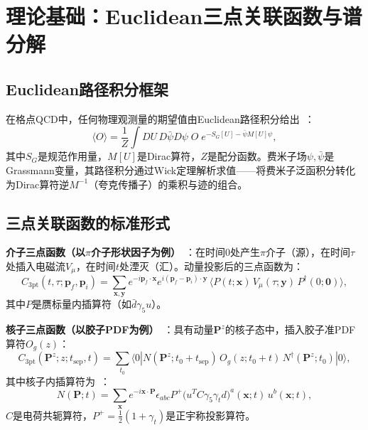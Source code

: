 \documentclass[12pt,a4paper]{ctexart}
\theoremstyle{definition}
\begin{document}
\section{理论基础：Euclidean三点关联函数与谱分解}

\subsection{Euclidean路径积分框架}

在格点QCD中，任何物理观测量的期望值由Euclidean路径积分给出~\cite{GattringerLang2010,wickContraction2026}：
\begin{equation}\label{eq:path_integral}
    \langle O \rangle = \frac{1}{Z} \int DU\,D\bar{\psi}D\psi \; O\; e^{-S_G[U] - \bar{\psi}M[U]\psi},
\end{equation}
其中$S_G$是规范作用量，$M[U]$是Dirac算符，$Z$是配分函数。费米子场$\psi,\bar{\psi}$是Grassmann变量，其路径积分通过Wick定理解析求值——将费米子泛函积分转化为Dirac算符逆$M^{-1}$（夸克传播子）的乘积与迹的组合。

\subsection{三点关联函数的标准形式}

\textbf{介子三点函数（以$\pi$介子形状因子为例）}~\cite{GattringerLang2010,formFactors2026}：在时间0处产生$\pi$介子（源），在时间$\tau$处插入电磁流$V_\mu$，在时间$t$处湮灭（汇）。动量投影后的三点函数为：
\begin{equation}\label{eq:meson_3pt}
    C_{3\text{pt}}(t, \tau; \mathbf{p}_f, \mathbf{p}_i) =
    \sum_{\mathbf{x},\mathbf{y}} e^{-i\mathbf{p}_f\cdot\mathbf{x}} e^{i(\mathbf{p}_f-\mathbf{p}_i)\cdot\mathbf{y}}\,
    \langle P(t;\mathbf{x})\, V_\mu(\tau;\mathbf{y})\, P^\dagger(0;\mathbf{0}) \rangle,
\end{equation}
其中$P$是赝标量内插算符（如$\bar{d}\gamma_5 u$）。

\textbf{核子三点函数（以胶子PDF为例）}~\cite{correlationFunctions2026}：具有动量$\mathbf{P}^z$的核子态中，插入胶子准PDF算符$O_g(z)$：
\begin{equation}\label{eq:nucleon_3pt}
    C_{3\text{pt}}(\mathbf{P}^z; z; t_{\text{sep}}, t) =
    \sum_{t_0} \langle 0 | N(\mathbf{P}^z; t_0+t_{\text{sep}})\, O_g(z; t_0+t)\, N^\dagger(\mathbf{P}^z; t_0) | 0 \rangle,
\end{equation}
其中核子内插算符为~\cite{correlationFunctions2026,kineEnhance2015}：
\begin{equation}\label{eq:nucleon_interp}
    N(\mathbf{P}; t) = \sum_{\mathbf{x}} e^{-i\mathbf{x}\cdot\mathbf{P}} \epsilon_{abc} P^+ \bigl(u^T C\gamma_5\gamma_t d\bigr)^a(\mathbf{x};t)\, u^b(\mathbf{x};t),
\end{equation}
$C$是电荷共轭算符，$P^+ = \frac{1}{2}(1+\gamma_t)$是正宇称投影算符。
\end{document}
